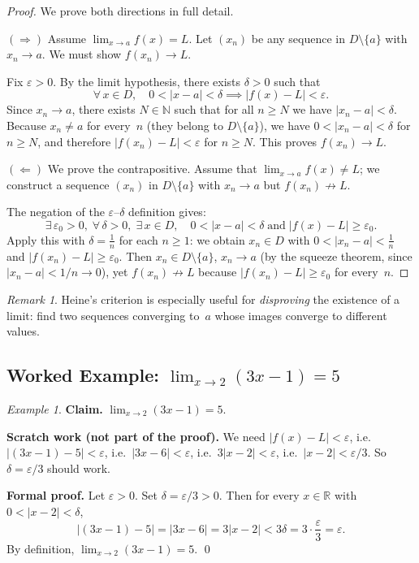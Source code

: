\documentclass[12pt,a4paper,openany]{book}
\theoremstyle{definition}
\theoremstyle{remark}
\newtheorem{remark}{Remark}[chapter]
\newtheorem{example}{Example}[chapter]
\begin{document}
\begin{proof}
We prove both directions in full detail.

\medskip\noindent
$(\Rightarrow)$\; Assume $\lim_{x\to a}f(x)=L$.
Let $(x_n)$ be any sequence in $D\setminus\{a\}$ with $x_n\to a$.
We must show $f(x_n)\to L$.

Fix $\varepsilon>0$.  By the limit hypothesis, there exists $\delta>0$
such that
\[
  \forall\, x\in D,\quad
  0<|x-a|<\delta \implies |f(x)-L|<\varepsilon.
\]
Since $x_n\to a$, there exists $N\in\mathbb{N}$ such that for all
$n\ge N$ we have $|x_n - a|<\delta$.  Because $x_n\neq a$ for every~$n$
(they belong to $D\setminus\{a\}$), we have $0<|x_n - a|<\delta$ for
$n\ge N$, and therefore $|f(x_n)-L|<\varepsilon$ for $n\ge N$.  This
proves $f(x_n)\to L$.

\medskip\noindent
$(\Leftarrow)$\; We prove the contrapositive.  Assume that
$\lim_{x\to a}f(x)\neq L$; we construct a sequence $(x_n)$ in
$D\setminus\{a\}$ with $x_n\to a$ but $f(x_n)\not\to L$.

The negation of the $\varepsilon$--$\delta$ definition gives:
\[
  \exists\,\varepsilon_0>0,\;\forall\,\delta>0,\;
  \exists\, x\in D,\quad
  0<|x-a|<\delta \;\text{and}\; |f(x)-L|\ge\varepsilon_0.
\]
Apply this with $\delta=\tfrac{1}{n}$ for each $n\ge 1$: we obtain
$x_n\in D$ with $0<|x_n-a|<\tfrac{1}{n}$ and
$|f(x_n)-L|\ge\varepsilon_0$.  Then $x_n\in D\setminus\{a\}$,
$x_n\to a$ (by the squeeze theorem, since $|x_n-a|<1/n\to 0$), yet
$f(x_n)\not\to L$ because $|f(x_n)-L|\ge\varepsilon_0$ for every~$n$.
\end{proof}

\begin{remark}
Heine's criterion is especially useful for \emph{disproving} the
existence of a limit: find two sequences converging to~$a$ whose images
converge to different values.
\end{remark}

\subsection{Worked Example: \texorpdfstring{$\lim_{x\to 2}(3x-1)=5$}{lim(3x-1)=5}}

\begin{example}\label{ex:limit-linear}
\textbf{Claim.}\; $\displaystyle\lim_{x\to 2}(3x-1)=5$.

\medskip\noindent
\textbf{Scratch work (not part of the proof).}\;
We need $|f(x)-L|<\varepsilon$, i.e.\
$|(3x-1)-5|<\varepsilon$, i.e.\ $|3x-6|<\varepsilon$, i.e.\
$3|x-2|<\varepsilon$, i.e.\ $|x-2|<\varepsilon/3$.
So $\delta=\varepsilon/3$ should work.

\medskip\noindent
\textbf{Formal proof.}\;
Let $\varepsilon>0$.  Set $\delta=\varepsilon/3>0$.  Then for every
$x\in\mathbb{R}$ with $0<|x-2|<\delta$,
\[
  |(3x-1)-5| = |3x-6| = 3|x-2| < 3\delta = 3\cdot\frac{\varepsilon}{3}
  = \varepsilon.
\]
By definition, $\lim_{x\to 2}(3x-1)=5$.  \qed
\end{example}
\end{document}
